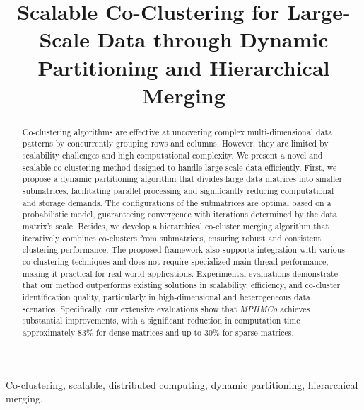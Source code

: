 \documentclass[journal]{IEEEtran}
\begin{document}
\title{\LARGE \bf Scalable Co-Clustering for Large-Scale Data through Dynamic Partitioning and Hierarchical Merging}


\author{}
\maketitle

\begin{abstract}
  Co-clustering algorithms are effective at uncovering complex multi-dimensional data patterns by concurrently grouping rows and columns. However, they are limited by scalability challenges and high computational complexity. We present a novel and scalable co-clustering method designed to handle large-scale data efficiently. First, we propose a dynamic partitioning algorithm that divides large data matrices into smaller submatrices, facilitating parallel processing and significantly reducing computational and storage demands. The configurations of the submatrices are optimal based on a probabilistic model, guaranteeing convergence with iterations determined by the data matrix's scale. Besides, we develop a hierarchical co-cluster merging algorithm that iteratively combines co-clusters from submatrices, ensuring robust and consistent clustering performance. The proposed framework also supports integration with various co-clustering techniques and does not require specialized main thread performance, making it practical for real-world applications. Experimental evaluations demonstrate that our method outperforms existing solutions in scalability, efficiency, and co-cluster identification quality, particularly in high-dimensional and heterogeneous data scenarios. Specifically, our extensive evaluations show that \emph{MPHMCo} achieves substantial improvements, with a significant reduction in computation time—approximately 83\% for dense matrices and up to 30\% for sparse matrices.
\end{abstract}

\begin{IEEEkeywords}
  Co-clustering, scalable, distributed computing, dynamic partitioning, hierarchical merging.
\end{IEEEkeywords}
\end{document}
